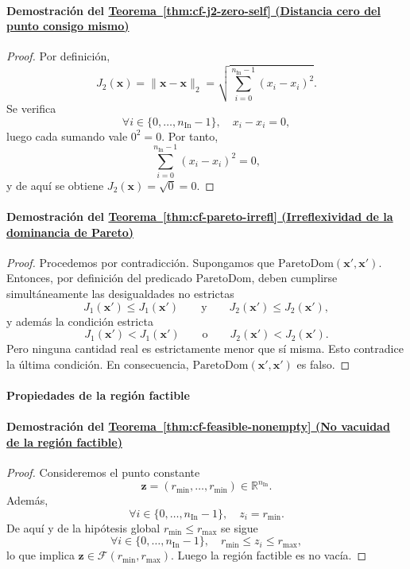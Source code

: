 \documentclass[12pt]{report} %
\begin{document}
\paragraph*{Demostración del \hyperref[thm:cf-j2-zero-self]{Teorema~\ref*{thm:cf-j2-zero-self} (Distancia cero del punto consigo mismo)}}
\begin{proof}
    Por definición,
    $$J_2(\mathbf{x}) = \|\mathbf{x} - \mathbf{x}\|_2 = \sqrt{\sum_{i=0}^{n_{\text{In}}-1}(x_i - x_i)^2}.$$
    Se verifica
    $$\forall i \in \{0, \ldots, n_{\text{In}}-1\},\quad x_i - x_i = 0,$$
    luego cada sumando vale $0^2 = 0$. Por tanto,
    $$\sum_{i=0}^{n_{\text{In}}-1}(x_i - x_i)^2 = 0,$$
    y de aquí se obtiene $J_2(\mathbf{x}) = \sqrt{0} = 0$.
\end{proof}

\paragraph*{Demostración del \hyperref[thm:cf-pareto-irrefl]{Teorema~\ref*{thm:cf-pareto-irrefl} (Irreflexividad de la dominancia de Pareto)}}
\begin{proof}
    Procedemos por contradicción. Supongamos que $\mathrm{ParetoDom}(\mathbf{x}', \mathbf{x}')$. Entonces, por definición del predicado $\mathrm{ParetoDom}$, deben cumplirse simultáneamente las desigualdades no estrictas
    $$J_1(\mathbf{x}') \le J_1(\mathbf{x}') \qquad \text{y} \qquad J_2(\mathbf{x}') \le J_2(\mathbf{x}'),$$
    y además la condición estricta
    $$J_1(\mathbf{x}') < J_1(\mathbf{x}') \qquad \text{o} \qquad J_2(\mathbf{x}') < J_2(\mathbf{x}').$$
    Pero ninguna cantidad real es estrictamente menor que sí misma. Esto contradice la última condición. En consecuencia, $\mathrm{ParetoDom}(\mathbf{x}', \mathbf{x}')$ es falso.
\end{proof}

\paragraph*{Propiedades de la región factible}

\paragraph*{Demostración del \hyperref[thm:cf-feasible-nonempty]{Teorema~\ref*{thm:cf-feasible-nonempty} (No vacuidad de la región factible)}}
\begin{proof}
    Consideremos el punto constante
    $$\mathbf{z} = (r_{\min}, \ldots, r_{\min}) \in \mathbb{R}^{n_{\text{In}}}.$$
    Además,
    $$\forall i \in \{0, \ldots, n_{\text{In}}-1\},\quad z_i = r_{\min}.$$
    De aquí y de la hipótesis global $r_{\min} \le r_{\max}$ se sigue
    $$\forall i \in \{0, \ldots, n_{\text{In}}-1\},\quad r_{\min} \le z_i \le r_{\max},$$
    lo que implica $\mathbf{z} \in \mathcal{F}(r_{\min}, r_{\max})$. Luego la región factible es no vacía.
\end{proof}
\end{document}
